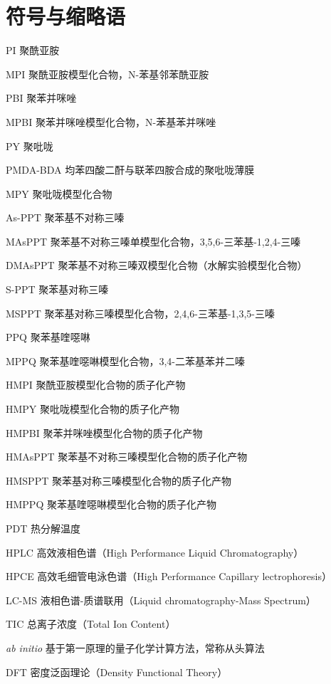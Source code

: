 \documentclass[report, twoside, UTF8, AutoFakeBold = 1, AutoFakeSlant, zihao = -4]{config}
\begin{document}
\chapter{符号与缩略语}

\begin{denotation}
  \item[PI] 聚酰亚胺
  \item[MPI] 聚酰亚胺模型化合物，N-苯基邻苯酰亚胺
  \item[PBI] 聚苯并咪唑
  \item[MPBI] 聚苯并咪唑模型化合物，N-苯基苯并咪唑
  \item[PY] 聚吡咙
  \item[PMDA-BDA] 均苯四酸二酐与联苯四胺合成的聚吡咙薄膜
  \item[MPY] 聚吡咙模型化合物
  \item[As-PPT] 聚苯基不对称三嗪
  \item[MAsPPT] 聚苯基不对称三嗪单模型化合物，3,5,6-三苯基-1,2,4-三嗪
  \item[DMAsPPT] 聚苯基不对称三嗪双模型化合物（水解实验模型化合物）
  \item[S-PPT] 聚苯基对称三嗪
  \item[MSPPT] 聚苯基对称三嗪模型化合物，2,4,6-三苯基-1,3,5-三嗪
  \item[PPQ] 聚苯基喹噁啉
  \item[MPPQ] 聚苯基喹噁啉模型化合物，3,4-二苯基苯并二嗪
  \item[HMPI] 聚酰亚胺模型化合物的质子化产物
  \item[HMPY] 聚吡咙模型化合物的质子化产物
  \item[HMPBI] 聚苯并咪唑模型化合物的质子化产物
  \item[HMAsPPT] 聚苯基不对称三嗪模型化合物的质子化产物
  \item[HMSPPT] 聚苯基对称三嗪模型化合物的质子化产物
  \item[HMPPQ] 聚苯基喹噁啉模型化合物的质子化产物
  \item[PDT] 热分解温度
  \item[HPLC] 高效液相色谱（High Performance Liquid Chromatography）
  \item[HPCE] 高效毛细管电泳色谱（High Performance Capillary lectrophoresis）
  \item[LC-MS] 液相色谱-质谱联用（Liquid chromatography-Mass Spectrum）
  \item[TIC] 总离子浓度（Total Ion Content）
  \item[\textit{ab initio}] 基于第一原理的量子化学计算方法，常称从头算法
  \item[DFT] 密度泛函理论（Density Functional Theory）

\end{denotation}
\end{document}
